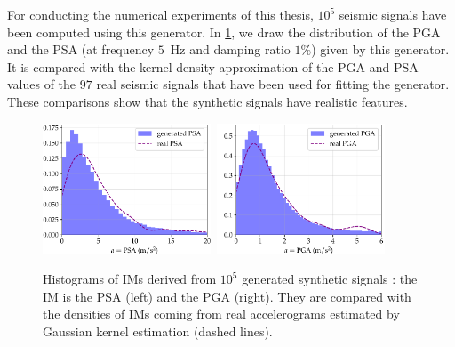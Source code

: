 For  conducting the numerical experiments of this thesis, $10^5$ seismic signals have been computed using this generator.
In \cref{fig:intro-frags:IM-density}, we draw the distribution of the PGA and the PSA (at frequency $5$~Hz and damping ratio $1\%$) given by this generator. It is compared with the kernel density approximation of the PGA and PSA values of the $97$ real seismic signals that have been used for fitting the generator. %
These comparisons show that the synthetic signals have realistic features.

\begin{figure}[h]
    \centering
    \includegraphics[width=5cm]{figures/intro-frags/PSA_density.pdf}\ 
    \includegraphics[width=5cm]{figures/intro-frags/PGA_density.pdf}
    \caption{Histograms of IMs derived from $10^5$ generated synthetic signals : the IM is the PSA (left) and the PGA (right). They are compared with the densities of IMs coming from real accelerograms estimated by Gaussian kernel estimation (dashed lines).} %
    \label{fig:intro-frags:IM-density}
\end{figure}












